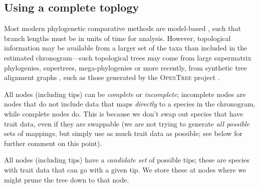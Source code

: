 \documentclass[a4paper,11pt]{article}
\begin{document}
\subsection{Using a complete toplogy}

Most modern phylogenetic comparative methods are model-based \citep[recently reviewed by][]{PennellHarmon}, such that branch lengths must be in units of time for analysis. However, topological information may be available from a larger set of the taxa than included in the estimated chronogram---such topological trees may come from large supermatrix phylogenies, supertrees, mega-phylogenies \citep[\emph{sensu}][]{Smithmega} or more recently, from synthetic tree alignment graphs \citep{Smith2013}, such as those generated by the \textsc{OpenTree} project \citep{OpenTree}.

All nodes (including tips) can be \emph{complete} or \emph{incomplete}; incomplete nodes are nodes that do not include data that maps \emph{directly} to a species in the chronogram, while complete nodes do.  This is because we don't swap out species that have trait data, even if they are swappable (we are not trying to generate \emph{all possible} sets of mappings, but simply use as much trait data as possible; see below for further comment on this point).

All nodes (including tips) have a \emph{candidate set} of possible tips; these are species with trait data that can go with a given tip.  We store these at nodes where we might prune the tree down to that node.
\end{document}
